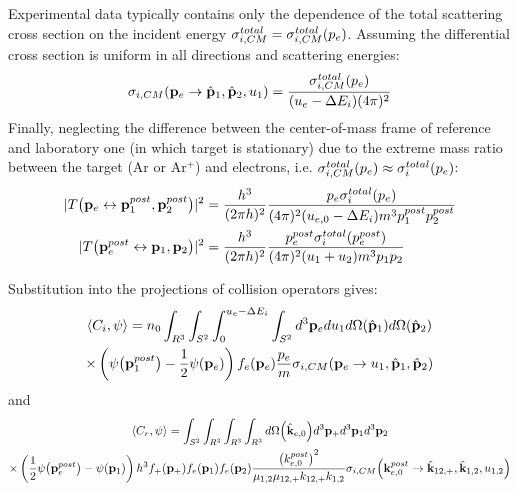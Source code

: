 \documentclass{article}[draft]
\begin{document}
Experimental data typically contains only the dependence of the total scattering cross section on the incident energy $\sigma^{total}_{i,CM} = \sigma^{total}_{i,CM}\of{p_{e}}$. Assuming the differential cross section is uniform in all directions and scattering energies: 
\begin{align*}
\sigma_{i,CM}\of{\vect{p}_{e} \rightarrow \hat{\vect{p}}_{1}, \hat{\vect{p}}_{2}, u_{1}}
= \frac{ \sigma^{total}_{i,CM}\of{p_{e}} }
{ (u_{e}-\Delta E_i) (4\pi)^2 }
\end{align*}
Finally, neglecting the difference between the center-of-mass frame of reference and laboratory one (in which target is stationary) due to the extreme mass ratio between the target (Ar or Ar$^+$) and electrons, i.e. $\sigma^{total}_{i,CM}\of{p_{e}} \approx \sigma^{total}_{i}\of{p_{e}}$:
\begin{align*}
| T\of{\vect{p}_e \leftrightarrow \vect{p}_1^{post}, \vect{p}_2^{post}} |^2
&= \frac{h^3}{(2\pi h)^2}
\frac{ p_{e} \sigma^{total}_{i}\of{p_{e}} }
{ (4\pi)^2  (u_{e,0}-\Delta E_i) 
m^3 p^{post}_{1} p^{post}_{2} }
\\
| T\of{\vect{p}_e^{post} \leftrightarrow \vect{p}_1, \vect{p}_2} |^2
&= \frac{h^3}{(2\pi h)^2}
\frac{ p_{e}^{post} \sigma^{total}_{i}\of{p_{e}^{post}} }
{ (4\pi)^2 (u_{1} + u_{2}) 
m^3 p_{1} p_{2} }
\end{align*}

Substitution into the projections of collision operators gives:
\begin{multline*}
\left< C_i, \psi \right> 
= 
n_0
\int_{R^3} \int_{S^2} \int_{0}^{u_{e} - \Delta E_i} \int_{S^2} 
d^3 \vect{p}_e
d u_1 d\Omega\of{\hat{\vect{p}}_1} 
d\Omega\of{\hat{\vect{p}}_2} 
\\
\times
\left( \psi\of{\vect{p}_1^{post}}  
- \frac12 \psi\of{\vect{p}_e} \right) f_e\of{\vect{p}_e} 
\frac{ p_{e} }{ m }
\sigma_{i,CM} \of{ \vect{p}_{e} \rightarrow u_{1}, \hat{\vect{p}}_{1}, \hat{\vect{p}}_{2}}
\end{multline*}
and
\begin{multline*}
\left< C_r, \psi \right>  =
\int_{S^2} 
\int_{R^3} \int_{R^3} \int_{R^3} 
d \Omega\of{\hat{\vect{k}}_{e,0}}
d^3 \vect{p}_+ d^3 \vect{p}_1 d^3 \vect{p}_2 
\\
\times
\left( \frac12 \psi\of{\vect{p}_e^{post}}
- \psi\of{\vect{p}_1} \right) h^3 f_+\of{\vect{p}_+} f_e\of{\vect{p}_1}  f_e\of{\vect{p}_2} 
\frac{ \left( k_{e,0}^{post} \right)^2 }
{ \mu_{1,2} \mu_{12,+} k_{12,+} k_{1,2} }
\sigma_{i,CM}\of{\vect{k}^{post}_{e,0} \rightarrow \hat{\vect{k}}_{12,+}, \hat{\vect{k}}_{1,2}, u_{1,2}}
\end{multline*}
\end{document}
